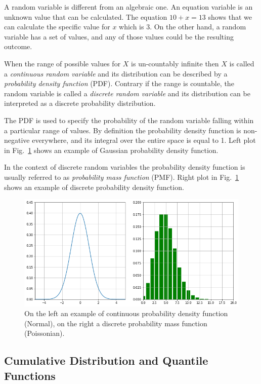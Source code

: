 A random variable is different from an algebraic one. An equation variable is an unknown value that can be calculated. The equation $10 + x = 13$ shows that we can calculate the specific value for $x$ which is 3. On the other hand, a random variable has a set of values, and any of those values could be the resulting outcome.

When the range of possible values for $X$ is un-countably infinite then $X$ is called a \emph{continuous random variable} and its distribution can be described by a \emph{probability density function} (PDF). Contrary if the range is countable, the random variable is called a \emph{discrete random variable} and its distribution can be interpreted as a discrete probability distribution.

The PDF is used to specify the probability of the random variable falling within a particular range of values. By definition 
the probability density function is non-negative everywhere, and its integral over the entire space is equal to 1.
Left plot in Fig.~\ref{fig:pdf_pmf} shows an example of Gaussian probability density function.

In the context of discrete random variables the probability density function is usually referred to as \emph{probability mass function} (PMF). Right plot in Fig.~\ref{fig:pdf_pmf} shows an example of discrete probability density function.

\begin{figure}[htb]
	\centering
	\includegraphics[width=1.\textwidth]{figures/pdf_pmf.png}
	\caption{On the left an example of continuous probability density function (Normal), on the right a discrete probability mass function (Poissonian).}
	\label{fig:pdf_pmf}
\end{figure}

\subsection{Cumulative Distribution and Quantile Functions}
\label{sec:quantile-function}

